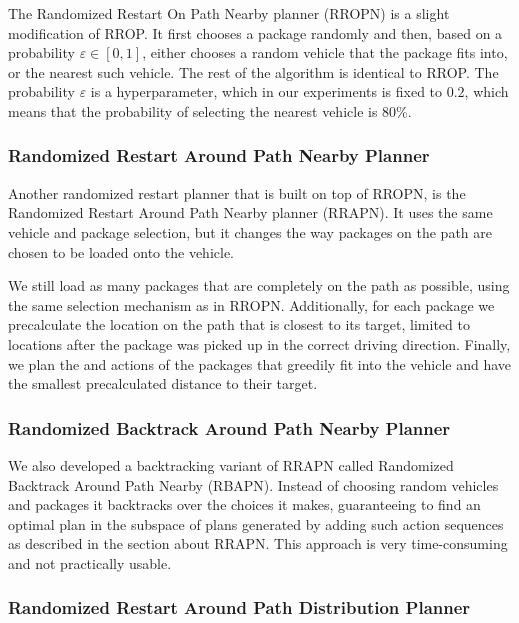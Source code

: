 The Randomized Restart On Path Nearby planner (RROPN)
is a slight modification of RROP.
It first chooses a package randomly and then,
based on a probability $\varepsilon \in [0, 1]$,
either chooses a random vehicle that the package fits into,
or the nearest such vehicle.
The rest of the algorithm is identical to RROP.
The probability $\varepsilon$ is a hyperparameter,
which in our experiments is fixed to $0.2$,
which means that the probability of selecting the nearest vehicle is 80\%.

\subsubsection{Randomized Restart Around Path Nearby Planner}\label{rrapn}

Another randomized restart planner that is built on top of RROPN,
is the Randomized Restart Around Path Nearby planner (RRAPN).
It uses the same vehicle and package selection,
but it changes the way packages on the path are chosen to be loaded
onto the vehicle.

We still load as many packages that are completely on the path
as possible, using the same selection mechanism as in RROPN.
Additionally, for each package we precalculate
the location on the path that is closest to its target,
limited to locations after the package was picked up
in the correct driving direction.
Finally, we plan the \pickup{} and \drop{} actions of the
packages that greedily fit into the vehicle and
have the smallest precalculated distance to their target.

\subsubsection{Randomized Backtrack Around Path Nearby Planner}\label{rbapn}

We also developed a backtracking variant of RRAPN
called Randomized Backtrack Around Path Nearby (RBAPN).
Instead of choosing random vehicles and packages
it backtracks over the choices it makes,
guaranteeing to find an optimal
plan in the subspace of plans
generated by adding such action sequences as described in
the section about RRAPN. This approach is very
time-consuming and not practically usable.

\subsubsection{Randomized Restart Around Path Distribution Planner}\label{rrapd}


